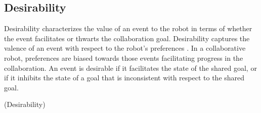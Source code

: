 \documentclass{aamas2016}
\begin{document}
\subsection{Desirability}

Desirability characterizes the value of an event to the robot in terms of
whether the event facilitates or thwarts the collaboration goal. Desirability
captures the valence of an event with respect to the robot's preferences
\cite{gratch:domain-independent}. In a collaborative robot, preferences are
biased towards those events facilitating progress in the collaboration. An event
is desirable if it facilitates the state of the shared goal, or if it inhibits
the state of a goal that is inconsistent with respect to the shared goal.

\begin{algorithm}
	\caption{(Desirability)}
	\label{alg:desirability}
	\begin{algorithmic}[1]
			\Statex
			\State {} 
			\State {}
			\State {} 
				\Statex
				\State {}
				\State {}

\end{algorithmic}
\end{algorithm}
\end{document}
